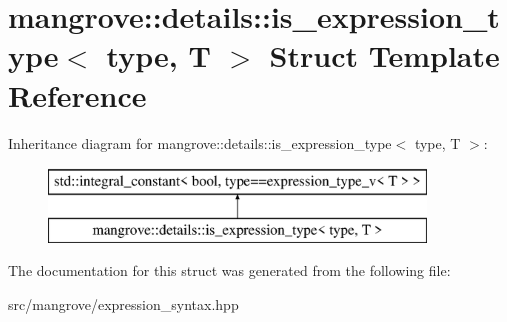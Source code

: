 \hypertarget{structmangrove_1_1details_1_1is__expression__type}{}\section{mangrove\+:\+:details\+:\+:is\+\_\+expression\+\_\+type$<$ type, T $>$ Struct Template Reference}
\label{structmangrove_1_1details_1_1is__expression__type}
Inheritance diagram for mangrove\+:\+:details\+:\+:is\+\_\+expression\+\_\+type$<$ type, T $>$\+:\begin{figure}[H]
\begin{center}
\leavevmode
\includegraphics[height=2.000000cm]{structmangrove_1_1details_1_1is__expression__type}
\end{center}
\end{figure}


The documentation for this struct was generated from the following file\+:\begin{DoxyCompactItemize}
\item 
src/mangrove/expression\+\_\+syntax.\+hpp\end{DoxyCompactItemize}
